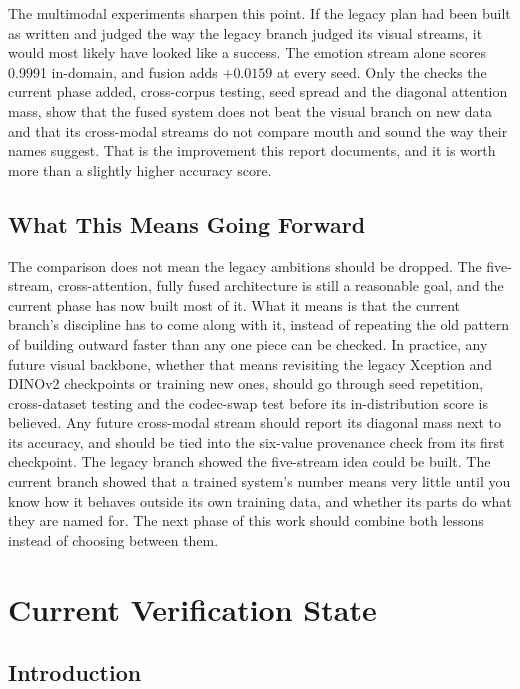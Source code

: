 The multimodal experiments sharpen this point. If the legacy plan had been
built as written and judged the way the legacy branch judged its visual
streams, it would most likely have looked like a success. The emotion stream
alone scores 0.9991 in-domain, and fusion adds $+0.0159$ at every seed. Only the
checks the current phase added, cross-corpus testing, seed spread and the
diagonal attention mass, show that the fused system does not beat the visual
branch on new data and that its cross-modal streams do not compare mouth and
sound the way their names suggest. That is the improvement this report
documents, and it is worth more than a slightly higher accuracy score.

\section{What This Means Going Forward}

The comparison does not mean the legacy ambitions should be dropped. The
five-stream, cross-attention, fully fused architecture is still a reasonable
goal, and the current phase has now built most of it. What it means is that the
current branch's discipline has to come along with it, instead of repeating the
old pattern of building outward faster than any one piece can be checked. In
practice, any future visual backbone, whether that means revisiting the legacy
Xception and DINOv2 checkpoints or training new ones, should go through seed
repetition, cross-dataset testing and the codec-swap test before its
in-distribution score is believed. Any future cross-modal stream should report
its diagonal mass next to its accuracy, and should be tied into the six-value
provenance check from its first checkpoint. The legacy branch showed the
five-stream idea could be built. The current branch showed that a trained
system's number means very little until you know how it behaves outside its own
training data, and whether its parts do what they are named for. The next phase
of this work should combine both lessons instead of choosing between them.

\chapter{Current Verification State}
\label{ch:verification}

\section{Introduction}

